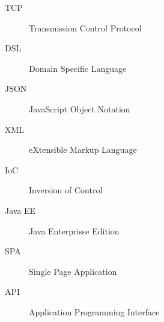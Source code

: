\begin{Glossary}
\begin{description}
\item[TCP]Transmission Control Protocol
\item[DSL]Domain Specific Language
\item[JSON]JavaScript Object Notation
\item[XML]eXtensible Markup Language
\item[IoC]Inversion of Control
\item[Java EE]Java Enterprisse Edition
\item[SPA]Single Page Application
\item[API]Application Programming Interface
\end{description}
\end{Glossary}